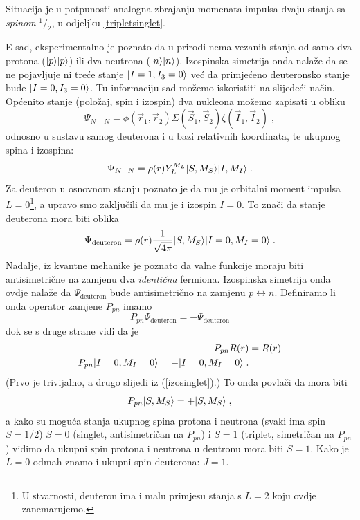 Situacija je u potpunosti analogna zbrajanju momenata impulsa
dvaju stanja sa \emph{spinom} $^1/_2$, u odjeljku \ref{tripletsinglet}.

E sad, eksperimentalno je poznato da u prirodi nema vezanih stanja
od samo dva protona ($| p \rangle| p \rangle$)  ili dva neutrona
($| n \rangle| n \rangle$). Izospinska simetrija onda nalaže da se ne pojavljuje
ni treće stanje $| I=1, I_3=0 \rangle$ već da primjećeno deuteronsko
stanje bude $| I=0, I_3 = 0 \rangle$.
Tu informaciju sad možemo iskoristiti na slijedeći način. Općenito
stanje (položaj, spin i izospin) dva nukleona možemo zapisati u obliku
\begin{equation}
 \Psi_{N-N} = \phi(\vec{r}_1, \vec{r}_2) \Sigma(\vec{S}_1, \vec{S}_2)
\zeta(\vec{I}_1, \vec{I}_2) \;,
\end{equation}
odnosno u sustavu samog deuterona i u bazi relativnih koordinata, te ukupnog spina i izospina:
\begin{equation}
 \Psi_{N-N} = \rho(r) Y^{M_L}_{L} | S, M_S \rangle | I, M_I \rangle \;.
\end{equation}
Za deuteron u osnovnom stanju poznato je da mu je orbitalni moment
impulsa $L=0$\footnote{U stvarnosti, deuteron ima i malu primjesu
stanja s $L=2$ koju ovdje zanemarujemo.}, a upravo smo zaključili 
da mu je i izospin $I=0$.
To znači da stanje deuterona mora biti oblika
\begin{equation}
\Psi_{\text{deuteron}} = \rho(r) \frac{1}{\sqrt{4\pi}} 
| S, M_S \rangle | I=0,M_I=0 \rangle\;.
\end{equation}
Nadalje, iz kvantne mehanike je poznato da valne funkcije moraju biti
antisimetrične na zamjenu dva \emph{identična} fermiona. Izospinska
simetrija onda ovdje nalaže da $\Psi_{\text{deuteron}}$ bude
antisimetrično na zamjenu $p\leftrightarrow n$. Definiramo li onda
operator zamjene $P_{pn}$ imamo
\begin{equation}
   P_{pn} \Psi_{\text{deuteron}} = - \Psi_{\text{deuteron}}
\end{equation}
dok se s druge strane vidi da je
\begin{align}
P_{pn} R(r) &= R(r) \\
P_{pn} | I=0,M_I=0 \rangle = - | I=0,M_I=0 \rangle \;.
\end{align}
(Prvo je trivijalno, a drugo slijedi iz (\ref{izosinglet}).)
To onda povlači da mora biti
\begin{equation}
 P_{pn} | S, M_S \rangle = + | S, M_S \rangle \;,
\end{equation}
a kako su moguća stanja ukupnog spina protona i neutrona (svaki ima spin
$S=1/2$) $S=0$ (singlet, antisimetričan
na $P_{pn}$) i $S=1$ (triplet, simetričan na $P_{pn}$) vidimo da
ukupni spin protona i neutrona u deutronu mora biti $S=1$. Kako
je $L=0$ odmah znamo i ukupni spin deuterona: $J=1$.

